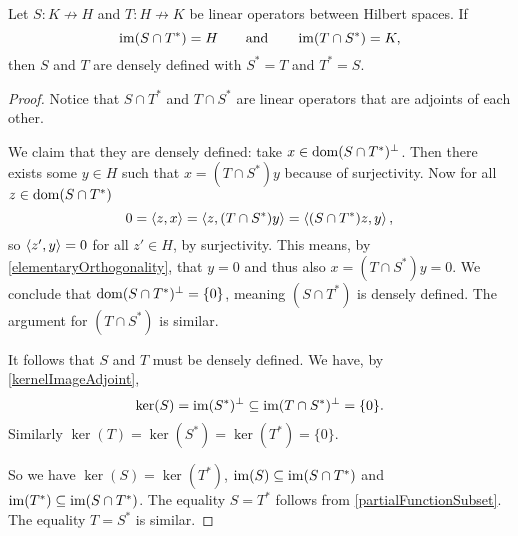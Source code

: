\begin{proposition} \label{adjointRangeCriterion}
Let $S: K\not\to H$ and $T: H\not\to K$ be linear operators between Hilbert spaces. If
\[ \operatorname{im}(S\cap T^*) = H \qquad\text{and}\qquad \operatorname{im}(T\cap S^*) = K, \]
then $S$ and $T$ are densely defined with $S^* = T$ and $T^* = S$.
\end{proposition}
\begin{proof}
Notice that $S\cap T^*$ and $T\cap S^*$ are linear operators that are adjoints of each other.

We claim that they are densely defined: take $x\in \operatorname{dom}(S\cap T^*)^\perp$. Then there exists some $y\in H$ such that $x = (T\cap S^*)y$ because of surjectivity. Now for all $z\in \operatorname{dom}(S\cap T^*)$
\[ 0 = \left\langle z,x \right\rangle = \left\langle z, (T\cap S^*)y \right\rangle = \left\langle (S\cap T^*)z, y \right\rangle, \]
so $\left\langle z',y \right\rangle = 0$ for all $z'\in H$, by surjectivity. This means, by \ref{elementaryOrthogonality}, that $y=0$ and thus also $x = (T\cap S^*)y = 0$. We conclude that $\operatorname{dom}(S\cap T^*)^\perp = \{0\}$, meaning $(S\cap T^*)$ is densely defined. The argument for $(T\cap S^*)$ is similar.

It follows that $S$ and $T$ must be densely defined. We have, by \ref{kernelImageAdjoint},
\[ \ker(S) = \operatorname{im}(S^*)^\perp \subseteq \operatorname{im}(T\cap S^*)^\perp = \{0\}. \]
Similarly $\ker(T) = \ker(S^*) = \ker(T^*) = \{0\}$.

So we have $\ker(S) = \ker(T^*)$, $\operatorname{im}(S)\subseteq \operatorname{im}(S\cap T^*)$ and $\operatorname{im}(T^*)\subseteq \operatorname{im}(S\cap T^*)$. The equality $S = T^*$ follows from \ref{partialFunctionSubset}. The equality $T = S^*$ is similar.
\end{proof}

